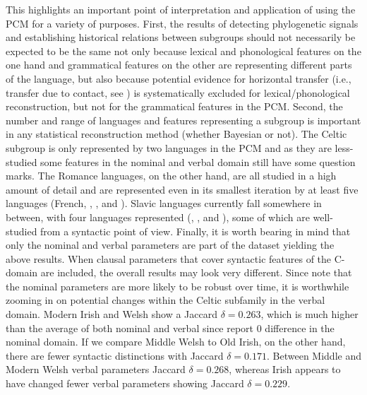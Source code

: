 \documentclass[output=paper,colorlinks,citecolor=brown]{langscibook}
\begin{document}
This highlights an important point of interpretation and application of using the PCM for a variety of purposes. First, the results of detecting phylogenetic signals and establishing historical relations between subgroups should not necessarily be expected to be the same not only because lexical and phonological features on the one hand and grammatical features on the other are representing different parts of the language, but also because potential evidence for horizontal transfer (i.e., transfer due to contact, see ) is systematically excluded for lexical/phonological reconstruction, but not for the grammatical features in the PCM. Second, the number and range of languages and features representing a subgroup is important in any statistical reconstruction method (whether Bayesian or not). The Celtic subgroup is only represented by two languages in the PCM and as they are less-studied some features in the nominal and verbal domain still have some question marks. The Romance languages, on the other hand, are all studied in a high amount of detail and are represented even in its smallest iteration by at least five languages (French, , ,  and ). Slavic languages currently fall somewhere in between, with four languages represented (, ,  and ), some of which are well-studied from a syntactic point of view. Finally, it is worth bearing in mind that only the nominal and verbal parameters are part of the dataset yielding the above results. When clausal parameters that cover syntactic features of the C-domain are included, the overall results may look very different. Since \citet{mm:longobardi_evidence_2009} note that the nominal parameters are more likely to be robust over time, it is worthwhile zooming in on potential changes within the Celtic subfamily in the verbal domain. Modern Irish and Welsh show a Jaccard $\delta=0.263$, which is much higher than the average of both nominal and verbal  since \citet{mm:ceolin_at_2021} report 0 difference in the nominal domain. If we compare Middle Welsh to Old Irish, on the other hand, there are fewer syntactic distinctions with Jaccard $\delta=0.171$. Between Middle and Modern Welsh verbal parameters Jaccard $\delta=0.268$, whereas Irish appears to have changed fewer verbal parameters showing  Jaccard $\delta=0.229$.
\end{document}

